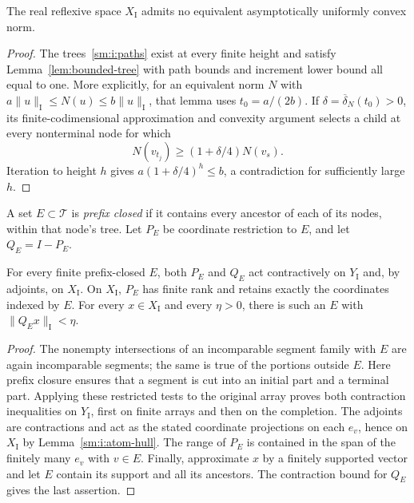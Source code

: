 \begin{corollary}\label{sm:i:auc-obstruction}
The real reflexive space $X_{\mathrm I}$ admits no equivalent
asymptotically uniformly convex norm.
\end{corollary}

\begin{proof}
The trees~\eqref{sm:i:paths} exist at every finite height and satisfy
Lemma~\ref{lem:bounded-tree} with path bounds and increment lower bound
all equal to one.  More explicitly, for an equivalent norm $N$ with
$a\|u\|_{\mathrm I}\leq N(u)\leq b\|u\|_{\mathrm I}$, that lemma
uses $t_0=a/(2b)$.  If
$\delta=\overline\delta_N(t_0)>0$, its finite-codimensional approximation
and convexity argument selects a child at every nonterminal node for
which
\[
 N(v_{t_j})\geq (1+\delta/4)N(v_s).
\]
Iteration to height $h$ gives
$a(1+\delta/4)^h\leq b$, a contradiction for sufficiently large $h$.
\end{proof}

A set $E\subset\mathcal T$ is \emph{prefix closed} if it contains every
ancestor of each of its nodes, within that node's tree.  Let $P_E$ be
coordinate restriction to $E$, and let $Q_E=I-P_E$.

\begin{lemma}\label{sm:i:projections}
For every finite prefix-closed $E$, both $P_E$ and $Q_E$ act
contractively on $Y_{\mathrm I}$ and, by adjoints, on $X_{\mathrm I}$.
On $X_{\mathrm I}$, $P_E$ has finite rank and retains exactly the
coordinates indexed by $E$.  For every $x\in X_{\mathrm I}$ and every
$\eta>0$, there is such an $E$ with $\|Q_E x\|_{\mathrm I}<\eta$.
\end{lemma}

\begin{proof}
The nonempty intersections of an incomparable segment family with $E$
are again incomparable segments; the same is true of the portions
outside $E$.  Here prefix closure ensures that a segment is cut into
an initial part and a terminal part.  Applying these restricted tests to
the original array proves both contraction inequalities on
$Y_{\mathrm I}$, first on finite arrays and then on the completion.
The adjoints are contractions and act as the stated coordinate
projections on each $e_v$, hence on $X_{\mathrm I}$ by
Lemma~\ref{sm:i:atom-hull}.  The range of $P_E$ is contained in the span
of the finitely many $e_v$ with $v\in E$.
Finally, approximate $x$ by a finitely supported vector and let $E$
contain its support and all its ancestors.  The contraction bound for
$Q_E$ gives the last assertion.
\end{proof}

